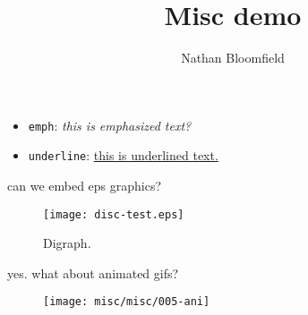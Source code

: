 \documentclass{ximera}
\title{Misc demo}
\author{Nathan Bloomfield}
\begin{document}
\maketitle

\begin{itemize}
\item \texttt{emph}: \emph{this is emphasized text?}
\item \texttt{underline}: \underline{this is underlined text.}
\end{itemize}

can we embed eps graphics?

\begin{figure}[!htb]
\begin{center}
\texttt{[image: disc-test.eps]}
\caption{Digraph.}
\end{center}
\label{fig:digraph}
\end{figure}

yes. what about animated gifs?

\begin{figure}
\begin{center}
\texttt{[image: misc/misc/005-ani]}
\end{center}
\end{figure}
\end{document}

